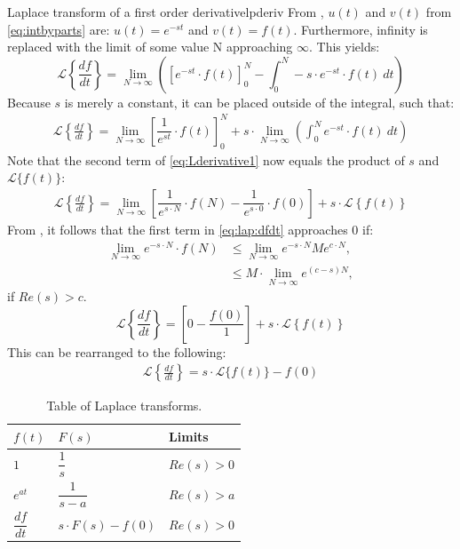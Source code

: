 \begin{prof}{Laplace transform of a first order derivative}{lpderiv}
From , $u(t)$ and $v(t)$ from \eqref{eq:intbyparts} are: $u(t) = e^{-st}$ and $v(t) = f(t)$. Furthermore, infinity is replaced with the limit of some value N approaching $\infty$. This yields:
$$\mathcal{L} \left\{\frac{df}{dt} \right\}=\lim_{N \to \infty} \left(\left[e^{-st}\cdot f(t)\right]_{0}^{N}-\int_{0}^{N} -s\cdot e^{-st}\cdot f(t)\ dt \right)$$
Because $s$ is merely a constant, it can be placed outside of the integral, such that:
\begin{align}
\mathcal{L} \left\{\frac{df}{dt} \right\}=\lim_{N \to \infty} \left[\dfrac{1}{e^{st}}\cdot f(t)\right]_{0}^{N}+ s \cdot \lim_{N \to \infty} \left( \int_{0}^{N}e^{-st}\cdot f(t)\ dt \right)\label{eq:Lderivative1}
\end{align}
Note that the second term of \eqref{eq:Lderivative1} now equals the product of $s$ and $\mathcal{L}\{f(t)\}$:
\begin{align}
\mathcal{L} \left\{\frac{df}{dt} \right\} = \lim_{N \to \infty}\left[\dfrac{1}{e^{s\cdot N}}\cdot f(N)-\dfrac{1}{e^{s\cdot 0}}\cdot f(0)\right]+s\cdot \mathcal{L} \left\{f(t) \right\} \label{eq:lap:dfdt}
\end{align}
From , it follows that the first term in \eqref{eq:lap:dfdt} approaches $0$ if:
\begin{align*}
\lim_{N \to \infty} e^{-s\cdot N}\cdot f(N) &\leq \lim_{N \to \infty} e^{-s\cdot N} Me^{c\cdot N},\\
&\leq M \cdot \lim_{N \to \infty} e^{(c-s)N},
\end{align*}
if $Re(s) > c$.
$$\mathcal{L} \left\{\frac{df}{dt} \right\} = \left[0-\dfrac{f(0)}{1}\right]+s\cdot \mathcal{L} \left\{f(t) \right\}$$
This can be rearranged to the following:
\begin{align*}
\mathcal{L} \left\{\frac{df}{dt} \right\} = s\cdot \mathcal{L}\{f(t)\}-f(0)
\end{align*}

\end{prof}
\begin{table}[H]
\center
\begin{tabular}{lll}
\hline
\multicolumn{1}{|l|}{$f(t)$}           & \multicolumn{1}{l|}{$F(s)$}                & \multicolumn{1}{l|}{Limits}    \\ \hline
\multicolumn{1}{|l|}{$1$}              & \multicolumn{1}{l|}{$\dfrac{1}{s}$}        & \multicolumn{1}{l|}{$Re(s)>0$} \\ \hline
\multicolumn{1}{|l|}{$e^{at}$}         & \multicolumn{1}{l|}{$\dfrac{1}{s-a}$}      & \multicolumn{1}{l|}{$Re(s)>a$} \\ \hline
\multicolumn{1}{|l|}{$\dfrac{df}{dt}$} & \multicolumn{1}{l|}{$s \cdot F(s) - f(0)$} & \multicolumn{1}{l|}{$Re(s)>0$} \\ \hline                          
\end{tabular}
\caption{Table of Laplace transforms.}
\label{lptable}
\end{table}
